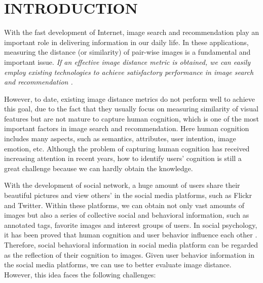 \vspace{-0.3cm}\section{INTRODUCTION}
With the fast development of Internet, image search and recommendation play an important role in delivering information in our daily life. In these applications, measuring the distance (or similarity) of pair-wise images is a fundamental and important issue. \emph{If an effective image distance metric is obtained, we can easily employ existing technologies to achieve satisfactory performance in image search \cite{visualrank} and recommendation \cite{cbf}.}

However, to date, existing image distance metrics do not perform well to achieve this goal, due to the fact that they usually focus on measuring similarity of visual features but are not mature to capture human cognition, which is one of the most important factors in image search and recommendation. Here human cognition includes many aspects, such as semantics, attributes, user intention, image emotion, etc. Although the problem of capturing human cognition has received increasing attention in recent years, how to identify users' cognition is still a great challenge because we can hardly obtain the knowledge.

 With the development of social network, a huge amount of users share their beautiful pictures and view others' in the social media platforms, such as Flickr and Twitter. Within these platforms, we can obtain not only vast amounts of images but also a series of collective social and behavioral information, such as annotated tags, favorite images and interest groups of users. In social psychology, it has been proved that human cognition and user behavior influence each other \cite{cognitive}. Therefore, social behavioral information in social media platform can be regarded as the reflection of their cognition to images. Given user behavior information in the social media platforms, we can use to better evaluate image distance. However, this idea faces the following challenges:





